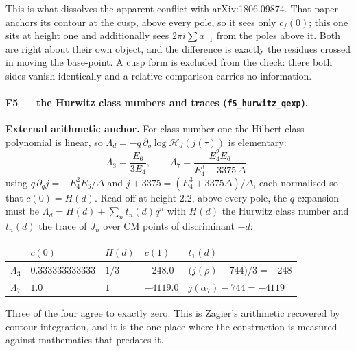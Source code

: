 \documentclass[11pt]{article}
\newcommand{\code}[1]{\texttt{#1}}
\begin{document}
This is what dissolves the apparent conflict with arXiv:1806.09874. That paper anchors its
contour at the cusp, above every pole, so it sees only $c_f(0)$; this one sits at height one
and additionally sees $2\pi i\sum a_{-1}$ from the poles above it. Both are right about their
own object, and the difference is exactly the residues crossed in moving the base-point. A cusp
form is excluded from the check: there both sides vanish identically and a relative comparison
carries no information.

\paragraph{F5 --- the Hurwitz class numbers and traces (\code{f5\_hurwitz\_qexp}).}
\textbf{External arithmetic anchor.} For class number one the Hilbert class polynomial is
linear, so $\Lambda_d=-q\,\partial_q\log\mathcal H_d(j(\tau))$ is elementary:
\[
\Lambda_3=\frac{E_6}{3E_4},\qquad
\Lambda_7=\frac{E_4^2E_6}{E_4^3+3375\,\Delta},
\]
using $q\,\partial_qj=-E_4^2E_6/\Delta$ and $j+3375=(E_4^3+3375\Delta)/\Delta$, each normalised
so that $c(0)=H(d)$. Read off at height $2.2$, above every pole, the $q$-expansion must be
$\Lambda_d=H(d)+\sum_nt_n(d)q^n$ with $H(d)$ the Hurwitz class number and $t_n(d)$ the trace of
$J_n$ over CM points of discriminant $-d$:
\begin{center}
\begin{tabular}{@{}lllll@{}}
& $c(0)$ & $H(d)$ & $c(1)$ & $t_1(d)$\\
\hline
$\Lambda_3$ & $0.333333333333$ & $1/3$ & $-248.0$ & $\big(j(\rho)-744\big)/3=-248$\\
$\Lambda_7$ & $1.0$ & $1$ & $-4119.0$ & $j(\alpha_7)-744=-4119$\\
\end{tabular}
\end{center}
\noindent Three of the four agree to exactly zero. This is Zagier's arithmetic recovered by
contour integration, and it is the one place where the construction is measured against
mathematics that predates it.
\end{document}
